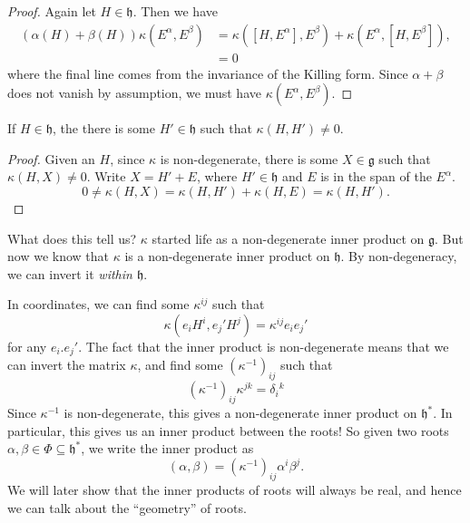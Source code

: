 \documentclass[a4paper]{article}
\begin{document}
\begin{proof}
  Again let $H \in \mathfrak{h}$. Then we have
  \begin{align*}
    (\alpha(H) + \beta(H)) \kappa(E^\alpha, E^\beta) &= \kappa([H, E^\alpha], E^\beta) + \kappa(E^\alpha, [H, E^\beta]),\\
    &= 0
  \end{align*}
  where the final line comes from the invariance of the Killing form. Since $\alpha + \beta$ does not vanish by assumption, we must have $\kappa(E^\alpha, E^\beta)$.
\end{proof}

\begin{lemma}
  If $H \in \mathfrak{h}$, the there is some $H' \in \mathfrak{h}$ such that $\kappa(H, H') \not= 0$.
\end{lemma}

\begin{proof}
  Given an $H$, since $\kappa$ is non-degenerate, there is some $X \in \mathfrak{g}$ such that $\kappa (H, X) \not= 0$. Write $X = H' + E$, where $H' \in \mathfrak{h}$ and $E$ is in the span of the $E^\alpha$.
  \[
    0\not= \kappa(H, X) = \kappa(H, H') + \kappa(H, E) = \kappa(H, H').
  \]
\end{proof}
What does this tell us? $\kappa$ started life as a non-degenerate inner product on $\mathfrak{g}$. But now we know that $\kappa$ is a non-degenerate inner product on $\mathfrak{h}$. By non-degeneracy, we can invert it \emph{within $\mathfrak{h}$}.

In coordinates, we can find some $\kappa^{ij}$ such that
\[
  \kappa(e_i H^i, e_j' H^j) = \kappa^{ij} e_i e_j'
\]
for any $e_i. e_j'$. The fact that the inner product is non-degenerate means that we can invert the matrix $\kappa$, and find some $(\kappa^{-1})_{ij}$ such that
\[
  (\kappa^{-1})_{ij} \kappa^{jk} = \delta_i\!^k
\]
Since $\kappa^{-1}$ is non-degenerate, this gives a non-degenerate inner product on $\mathfrak{h}^*$. In particular, this gives us an inner product between the roots! So given two roots $\alpha, \beta \in \Phi \subseteq \mathfrak{h}^*$, we write the inner product as
\[
  (\alpha, \beta) = (\kappa^{-1})_{ij} \alpha^i \beta^j.
\]
We will later show that the inner products of roots will always be real, and hence we can talk about the ``geometry'' of roots.
\end{document}
